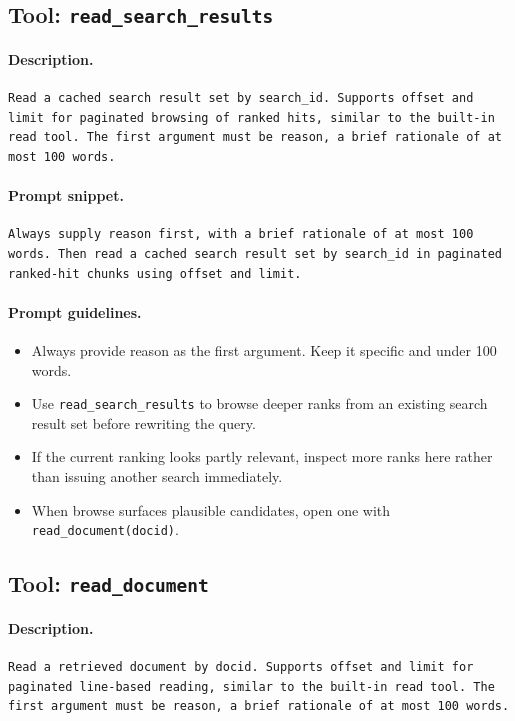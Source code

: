 \subsection{Tool: {\tt read\_search\_results}}
\label{tool:read-search-results}

\paragraph{Description.}
\begin{verbatim}
Read a cached search result set by search_id. Supports offset and
limit for paginated browsing of ranked hits, similar to the built-in
read tool. The first argument must be reason, a brief rationale of at
most 100 words.
\end{verbatim}

\paragraph{Prompt snippet.}
\begin{verbatim}
Always supply reason first, with a brief rationale of at most 100
words. Then read a cached search result set by search_id in paginated
ranked-hit chunks using offset and limit.
\end{verbatim}

\paragraph{Prompt guidelines.}
\begin{itemize}
  \item Always provide reason as the first argument. Keep it specific and under 100 words.
  \item Use \texttt{read\_search\_results} to browse deeper ranks from an existing search result set before rewriting the query.
  \item If the current ranking looks partly relevant, inspect more ranks here rather than issuing another search immediately.
  \item When browse surfaces plausible candidates, open one with \texttt{read\_document(docid)}.
\end{itemize}


\subsection{Tool: {\tt read\_document}}
\label{tool:read-document}

\paragraph{Description.}
\begin{verbatim}
Read a retrieved document by docid. Supports offset and limit for
paginated line-based reading, similar to the built-in read tool. The
first argument must be reason, a brief rationale of at most 100 words.
\end{verbatim}

